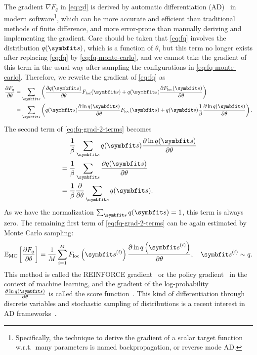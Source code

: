 The gradient $\nabla F_q$ in \cref{eq:gd} is derived by automatic differentiation (AD)~\cite{baydin2018automatic} in modern software\footnote{Specifically, the technique to derive the gradient of a scalar target function w.r.t.\ many parameters is named backpropagation, or reverse mode AD.}, which can be more accurate and efficient than traditional methods of finite difference, and more error-prone than manually deriving and implementing the gradient. Care should be taken that \cref{eq:fq} involves the distribution $q(\vs)$, which is a function of $\theta$, but this term no longer exists after replacing \cref{eq:fq} by \cref{eq:fq-monte-carlo}, and we cannot take the gradient of this term in the usual way after sampling the configurations in \cref{eq:fq-monte-carlo}. Therefore, we rewrite the gradient of \cref{eq:fq} as
\begin{align}
\frac{\partial F_q}{\partial \theta}
&= \sum_\vs \left( \frac{\partial q(\vs)}{\partial \theta} F_\text{loc}(\vs) + q(\vs) \frac{\partial F_\text{loc}(\vs)}{\partial \theta} \right) \\
&= \sum_\vs \left( q(\vs) \frac{\partial \ln q(\vs)}{\partial \theta} F_\text{loc}(\vs) + q(\vs) \frac{1}{\beta} \frac{\partial \ln q(\vs)}{\partial \theta} \right).
\label{eq:fq-grad-2-terms}
\end{align}
The second term of \cref{eq:fq-grad-2-terms} becomes
\begin{align}
&\phantom{{}={}}\frac{1}{\beta} \sum_\vs q(\vs) \frac{\partial \ln q(\vs)}{\partial \theta} \\
&= \frac{1}{\beta} \sum_\vs \frac{\partial q(\vs)}{\partial \theta} \\
&= \frac{1}{\beta} \frac{\partial}{\partial \theta} \sum_\vs q(\vs).
\end{align}
As we have the normalization $\sum_\vs q(\vs) = 1$, this term is always zero. The remaining first term of \cref{eq:fq-grad-2-terms} can be again estimated by Monte Carlo sampling:
\begin{equation}
\bbE_\text{MC}\left[ \frac{\partial F_q}{\partial \theta} \right]
= \frac{1}{M} \sum_{i = 1}^M F_\text{loc}\left( \vs^{(i)} \right) \frac{\partial \ln q\left( \vs^{(i)} \right)}{\partial \theta}, \quad
\vs^{(i)} \sim q.
\label{eq:fq-grad}
\end{equation}
This method is called the REINFORCE gradient~\cite{williams1992simple} or the policy gradient~\cite{sutton1999policy} in the context of machine learning, and the gradient of the log-probability $\frac{\partial \ln q(\vs)}{\partial \theta}$ is called the score function~\cite{fisher1935detection, hyvarinen2005estimation, mohamed2020monte}. This kind of differentiation through discrete variables and stochastic sampling of distributions is a recent interest in AD frameworks~\cite{krieken2021storchastic, arya2022automatic, catumba2023stochastic}.

